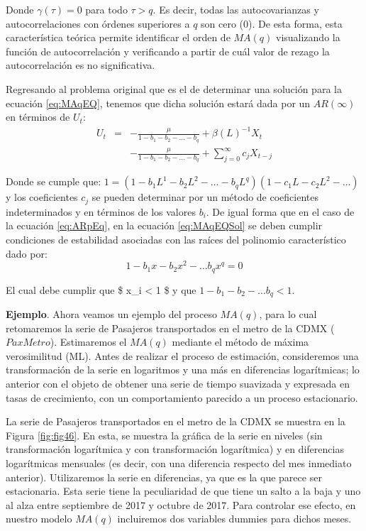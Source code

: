\documentclass[
]{book}
\begin{document}
Donde \(\gamma(\tau) = 0\) para todo \(\tau > q\). Es decir, todas las autocovarianzas y autocorrelaciones con órdenes superiores a \(q\) son cero (0). De esta forma, esta característica teórica permite identificar el orden de \(MA(q)\) visualizando la función de autocorrelación y verificando a partir de cuál valor de rezago la autocorrelación es no significativa.

Regresando al problema original que es el de determinar una solución para la ecuación \eqref{eq:MAqEQ}, tenemos que dicha solución estará dada por un \(AR(\infty)\) en términos de \(U_t\):
\begin{eqnarray}
    U_t & = & - \frac{\mu}{1 - b_1 - b_2 - \ldots - b_q} + \beta(L)^{-1} X_t \nonumber \\
    &   & - \frac{\mu}{1 - b_1 - b_2 - \ldots - b_q} + \sum_{j = 0}^{\infty} c_j X_{t-j} 
    \label{eq:MAqEQSol}
\end{eqnarray}

Donde se cumple que: \(1 = (1 - b_1 L^1 - b_2 L^2 - \ldots - b_q L^q)(1 - c_1 L - c_2 L^2 - \ldots)\) y los coeficientes \(c_j\) se pueden determinar por un método de coeficientes indeterminados y en términos de los valores \(b_i\). De igual forma que en el caso de la ecuación \eqref{eq:ARpEq}, en la ecuación \eqref{eq:MAqEQSol} se deben cumplir condiciones de estabilidad asociadas con las raíces del polinomio característico dado por:
\begin{equation}
    1 - b_1 x - b_2 x^2 - \ldots b_q x^q = 0
\end{equation}

El cual debe cumplir que \$ \textbar{} x\_i \textbar{} \textless{} 1 \$ y que \(1 - b_1 - b_2 - \ldots b_q < 1\).

\textbf{Ejemplo}. Ahora veamos un ejemplo del proceso \(MA(q)\), para lo cual retomaremos la serie de Pasajeros transportados en el metro de la CDMX (\(PaxMetro\)). Estimaremos el \(MA(q)\) mediante el método de máxima verosimilitud (ML). Antes de realizar el proceso de estimación, consideremos una transformación de la serie en logaritmos y una más en diferencias logarítmicas; lo anterior con el objeto de obtener una serie de tiempo suavizada y expresada en tasas de crecimiento, con un comportamiento parecido a un proceso estacionario.

La serie de Pasajeros transportados en el metro de la CDMX se muestra en la Figura \ref{fig:fig46}. En esta, se muestra la gráfica de la serie en niveles (sin transformación logarítmica y con transformación logarítmica) y en diferencias logarítmicas mensuales (es decir, con una diferencia respecto del mes inmediato anterior). Utilizaremos la serie en diferencias, ya que es la que parece ser estacionaria. Esta serie tiene la peculiaridad de que tiene un salto a la baja y uno al alza entre septiembre de 2017 y octubre de 2017. Para controlar ese efecto, en nuestro modelo \(MA(q)\) incluiremos dos variables dummies para dichos meses.
\end{document}
